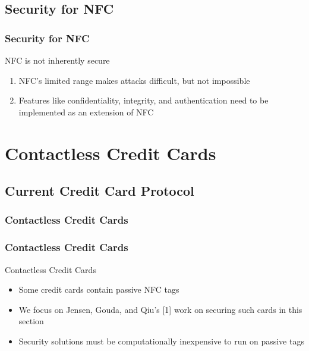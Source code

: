 \documentclass[unknownkeysallowed]{beamer}
\begin{document}
\subsection{Security for NFC}
\begin{frame}
\frametitle{Security for NFC}
  \begin{center}
  \begin{minipage}{.7\textwidth}
  \begin{block}{NFC is not inherently secure}
    \begin{enumerate}
      \item{NFC's limited range makes attacks difficult, but not impossible}
      \item{Features like confidentiality, integrity, and authentication need to be implemented as an extension of NFC}
    \end{enumerate}
  \end{block}
  \end{minipage}
  \end{center}
\end{frame}

\section{Contactless Credit Cards}
\subsection{Current Credit Card Protocol}
\begin{frame}
  \frametitle{Contactless Credit Cards}
    \begin{center}\begin{minipage}{.9\textwidth}
    \tableofcontents[currentsubsection, hideothersubsections, sectionstyle=show/shaded]
    \end{minipage}\end{center}
\end{frame}
%
\begin{frame}
\frametitle{Contactless Credit Cards}
  \begin{center}
  \begin{minipage}{.9\textwidth}
  \begin{block}{Contactless Credit Cards}
    \begin{itemize}
      \item{Some credit cards contain passive NFC tags}
      \pause
      \item{We focus on Jensen, Gouda, and Qiu's [1] work on securing such cards in this section}
      \pause
      \item{Security solutions must be computationally inexpensive to run on passive tags}
    \end{itemize}
  \end{block}
  \end{minipage}
  \end{center}
\end{frame}
\end{document}
